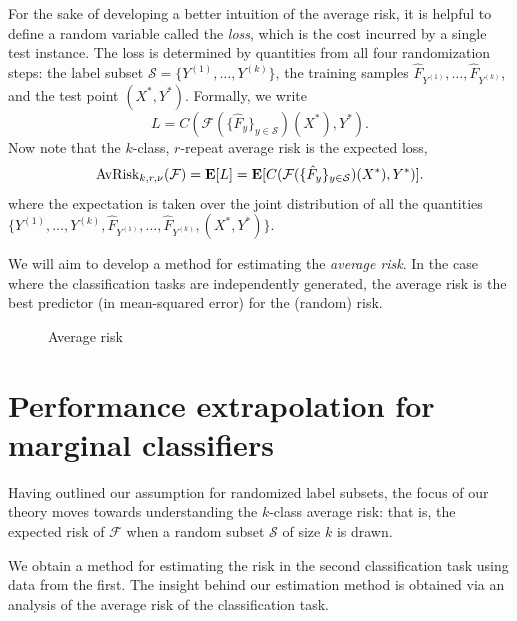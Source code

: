 \documentclass[12pt]{article}
\begin{document}
For the sake of developing a better intuition of the average risk, it
is helpful to define a random variable called the \emph{loss}, which
is the cost incurred by a single test instance.  The loss is
determined by quantities from all four randomization steps: the label
subset $\mathcal{S} = \{Y^{(1)},\hdots, Y^{(k)}\}$, the training samples
$\hat{F}_{Y^{(1)}},\hdots, \hat{F}_{Y^{(k)}}$, and the test point $(X^*, Y^*)$.
Formally, we write
\[
L = C(\mathcal{F}(\{\hat{F}_y\}_{y \in \mathcal{S}})(X^*), Y^*).
\]
Now note that the $k$-class, $r$-repeat average risk is the expected loss,
\begin{equation}\label{eq:avrisk_EL}
\text{AvRisk}_{k, r, \nu}(\mathcal{F}) = \textbf{E}[L] = \textbf{E}[C(\mathcal{F}(\{\hat{F}_y\}_{y \in \mathcal{S}})(X^*), Y^*)].
\end{equation}
where the expectation is taken over the joint distribution of all the
quantities $\{Y^{(1)},\hdots,
Y^{(k)}, \hat{F}_{Y^{(1)}},\hdots, \hat{F}_{Y^{(k)}}, (X^*, Y^*)\}$.

We will aim to develop a method for estimating the \emph{average
risk}.  In the case where the classification tasks are independently
generated, the average risk is the best predictor (in mean-squared
error) for the (random) risk.


\begin{figure}[h]
\centering
\caption{Average risk}\label{fig:average_risk}
\end{figure}




\section{Performance extrapolation for marginal classifiers}

Having outlined our assumption for randomized label subsets, the focus
of our theory moves towards understanding the $k$-class average risk:
that is, the expected risk of $\mathcal{F}$ when a random subset
$\mathcal{S}$ of size $k$ is drawn.

We obtain a method for estimating the risk in the second
classification task using data from the first.  The insight behind our
estimation method is obtained via an analysis of the average risk of
the classification task.
\end{document}
